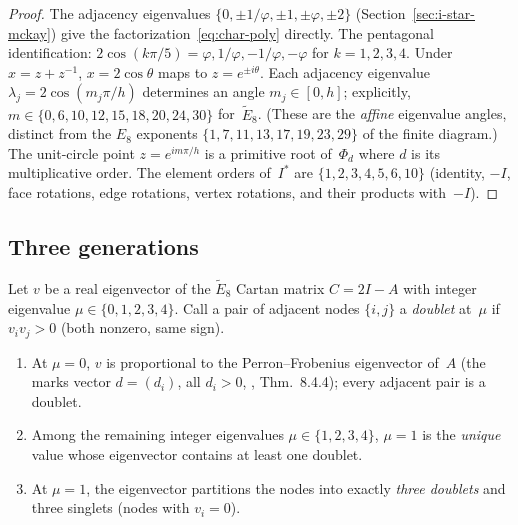 \begin{proof}
The adjacency eigenvalues $\{0, \pm 1/\varphi, \pm 1, \pm\varphi, \pm 2\}$
(Section~\ref{sec:i-star-mckay}) give the factorization~\eqref{eq:char-poly}
directly.
The pentagonal identification: $2\cos(k\pi/5) = \varphi, 1/\varphi, -1/\varphi, -\varphi$
for $k=1,2,3,4$.
Under $x = z + z^{-1}$, $x = 2\cos\theta$ maps to $z = e^{\pm i\theta}$.
Each adjacency eigenvalue $\lambda_j = 2\cos(m_j\pi/h)$ determines an
angle $m_j \in [0,h]$; explicitly,
$m \in \{0, 6, 10, 12, 15, 18, 20, 24, 30\}$ for~$\tilde{E}_8$.
(These are the \emph{affine} eigenvalue angles, distinct from the
$E_8$ exponents $\{1,7,11,13,17,19,23,29\}$ of the finite diagram.)
The unit-circle point $z = e^{im\pi/h}$ is a primitive root of~$\Phi_d$
where $d$ is its multiplicative order.
The element orders of~$I^*$ are $\{1,2,3,4,5,6,10\}$
(identity, $-I$, face rotations, edge rotations, vertex rotations,
and their products with~$-I$).
\end{proof}

\subsection{Three generations}
\label{sec:generations}

\begin{theorem}\label{thm:three-gen}
Let $v$ be a real eigenvector of the
$\tilde{E}_8$ Cartan matrix $C = 2I - A$ with integer
eigenvalue $\mu \in \{0, 1, 2, 3, 4\}$.
Call a pair of adjacent nodes $\{i, j\}$ a
\emph{doublet} at~$\mu$ if $v_i v_j > 0$ (both nonzero, same sign).
\begin{enumerate}
\item[\textup{(a)}] At $\mu = 0$, $v$ is proportional to the
  Perron--Frobenius eigenvector of~$A$ (the marks vector
  $d = (d_i)$, all $d_i > 0$, \citealt{HornJohnson2013}, Thm.~8.4.4);
  every adjacent pair is a doublet.
\item[\textup{(b)}] Among the remaining integer eigenvalues
  $\mu \in \{1, 2, 3, 4\}$, $\mu = 1$ is the \emph{unique} value
  whose eigenvector contains at least one doublet.
\item[\textup{(c)}] At $\mu = 1$, the eigenvector partitions the
  nodes into exactly \emph{three doublets} and three singlets
  (nodes with $v_i = 0$).
\end{enumerate}
\end{theorem}

